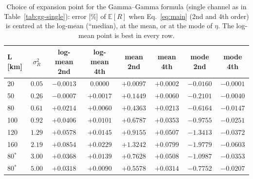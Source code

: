 \begin{table}[htbp]
\centering\small
\caption{Choice of expansion point for the Gamma--Gamma formula (single channel as in Table~\ref{tab:gg-single}): error [\%] of $\mathbb E[R]$ when Eq.~\eqref{eq:main} (2nd and 4th order) is centred at the log-mean (``median), at the mean, or at the mode of $\eta$. The log-mean point is best in every row.}
\label{tab:expoint}
\begin{tabular}{lccccccc}
\toprule
L [km] & $\sigma_R^2$ & log-mean 2nd & log-mean 4th & mean 2nd & mean 4th & mode 2nd & mode 4th\\
\midrule
20 & $0.05$ & $-0.0013$ & $0.0000$ & $+0.0097$ & $+0.0002$ & $-0.0160$ & $-0.0001$ \\
50 & $0.26$ & $-0.0007$ & $+0.0017$ & $+0.1449$ & $+0.0060$ & $-0.2101$ & $-0.0040$ \\
80 & $0.61$ & $+0.0214$ & $+0.0060$ & $+0.4363$ & $+0.0213$ & $-0.6164$ & $-0.0147$ \\
100 & $0.92$ & $+0.0406$ & $+0.0101$ & $+0.6787$ & $+0.0353$ & $-0.9755$ & $-0.0251$ \\
120 & $1.29$ & $+0.0578$ & $+0.0145$ & $+0.9155$ & $+0.0507$ & $-1.3413$ & $-0.0372$ \\
160 & $2.19$ & $+0.0854$ & $+0.0229$ & $+1.3242$ & $+0.0799$ & $-1.9779$ & $-0.0603$ \\
80$^{*}$ & $3.00$ & $+0.0368$ & $+0.0139$ & $+0.7628$ & $+0.0508$ & $-1.0987$ & $-0.0353$ \\
80$^{*}$ & $5.00$ & $+0.0318$ & $+0.0090$ & $+0.5578$ & $+0.0314$ & $-0.7752$ & $-0.0207$ \\

\bottomrule
\end{tabular}
\end{table}

